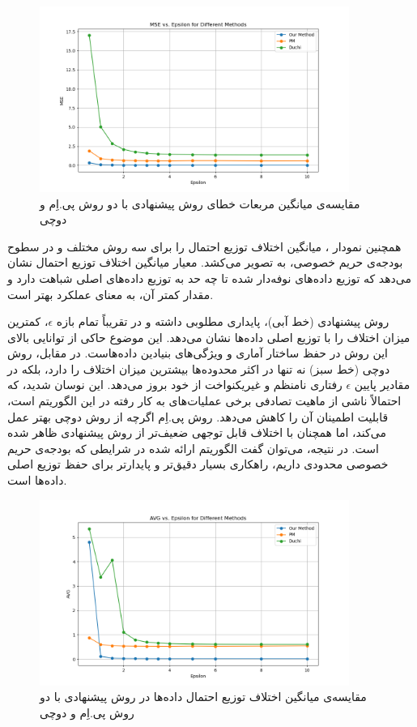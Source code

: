 \begin{figure}[h]
  \centering
  \includegraphics[width=0.9\textwidth]{figs/evaluation_eps_mse.png}
  \caption{مقایسه‌ی میانگین مربعات خطای روش پیشنهادی با دو روش پی.اِم و دوچی}
  \label{fig:eps_mse}
\end{figure}

همچنین نمودار ، میانگین اختلاف توزیع احتمال را برای سه روش مختلف و در سطوح بودجه‌ی حریم خصوصی، به تصویر می‌کشد. معیار میانگین اختلاف توزیع احتمال نشان می‌دهد که توزیع داده‌های نوفه‌دار شده تا چه حد به توزیع داده‌های اصلی شباهت دارد و مقدار کمتر آن، به معنای عملکرد بهتر است.

روش پیشنهادی (خط آبی)، پایداری مطلوبی داشته و در تقریباً تمام بازه $\epsilon$، کمترین میزان اختلاف را با توزیع اصلی داده‌ها نشان می‌دهد. این موضوع حاکی از توانایی بالای این روش در حفظ ساختار آماری و ویژگی‌های بنیادین داده‌هاست. در مقابل، روش دوچی (خط سبز) نه تنها در اکثر محدوده‌ها بیشترین میزان اختلاف را دارد، بلکه در مقادیر پایین $\epsilon$ رفتاری نامنظم و غیریکنواخت از خود بروز می‌دهد. این نوسان شدید، که احتمالاً ناشی از ماهیت تصادفی برخی عملیات‌های به کار رفته در این الگوریتم است، قابلیت اطمینان آن را کاهش می‌دهد. روش پی.اِم اگرچه از روش دوچی بهتر عمل می‌کند، اما همچنان با اختلاف قابل توجهی ضعیف‌تر از روش پیشنهادی ظاهر شده است. در نتیجه، می‌توان گفت الگوریتم ارائه شده در شرایطی که بودجه‌ی حریم خصوصی محدودی داریم، راهکاری بسیار دقیق‌تر و پایدارتر برای حفظ توزیع اصلی داده‌ها است.

\begin{figure}[h]
  \centering
  \includegraphics[width=0.9\textwidth]{figs/evaluation_eps_avg.png}
  \caption{مقایسه‌ی میانگین اختلاف توزیع احتمال داده‌ها در روش پیشنهادی با دو روش پی.اِم و دوچی}
  \label{fig:eps_avg}
\end{figure}

